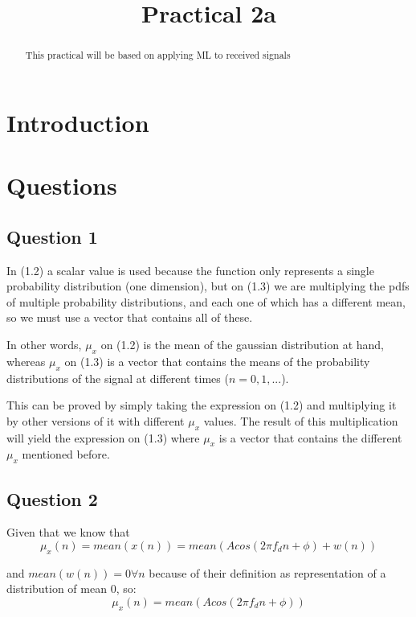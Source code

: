 \documentclass[conference,9pt]{IEEEtran}
\begin{document}
\title{Practical 2a}

\author{
}


\maketitle
\begin{abstract}
This practical will be based on applying ML to received signals
\end{abstract}



\section{Introduction}

\section{Questions}

\subsection{Question 1}
In (1.2) a scalar value is used because the function only represents a single probability distribution (one dimension), but on (1.3) we are multiplying the pdfs of multiple probability distributions, and each one of which has a different mean, so we must use a vector that contains all of these.

In other words, $\mu_x$ on (1.2) is the mean of the gaussian distribution at hand, whereas $\mu_x$ on (1.3) is a vector that contains the means of the probability distributions of the signal at different times ($n=0,1,...$).

This can be proved by simply taking the expression on (1.2) and multiplying it by other versions of it with different $\mu_x$ values. The result of this multiplication will yield the expression on (1.3) where $\mu_x$ is a vector that contains the different $\mu_x$ mentioned before.
\subsection{Question 2}
Given that we know that 
$$\mu_x(n)=mean(x(n))=mean(Acos(2\pi f_dn+\phi)+w(n))$$

and $mean(w(n))=0\forall n$ because of their definition as representation of a distribution of mean 0, so:
$$\mu_x(n)=mean(Acos(2\pi f_dn+\phi))$$
\end{document}
